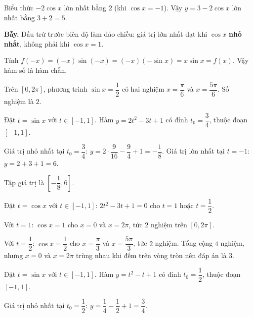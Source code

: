 \documentclass[11pt, a4paper]{article}
\begin{document}
\begin{dapan}[9 — Đáp án A]
Biểu thức $-2\cos x$ lớn nhất bằng $2$ (khi $\cos x = -1$). Vậy $y = 3 - 2\cos x$ lớn nhất bằng $3 + 2 = 5$.

\textbf{Bẫy.} Dấu trừ trước biên độ làm đảo chiều: giá trị lớn nhất đạt khi $\cos x$ \textbf{nhỏ nhất}, không phải khi $\cos x = 1$.
\end{dapan}

\begin{dapan}[10 — Đáp án B]
Tính $f(-x) = (-x)\sin(-x) = (-x)(-\sin x) = x\sin x = f(x)$. Vậy hàm số là hàm chẵn.
\end{dapan}

\begin{dapan}[11 — Đáp án B]
Trên $[0, 2\pi]$, phương trình $\sin x = \dfrac{1}{2}$ có hai nghiệm $x = \dfrac{\pi}{6}$ và $x = \dfrac{5\pi}{6}$. Số nghiệm là $2$.
\end{dapan}

\begin{dapan}[12 — Đáp án B]
Đặt $t = \sin x$ với $t \in [-1, 1]$. Hàm $y = 2t^2 - 3t + 1$ có đỉnh $t_0 = \dfrac{3}{4}$, thuộc đoạn $[-1, 1]$.

Giá trị nhỏ nhất tại $t_0 = \dfrac{3}{4}$: $y = 2 \cdot \dfrac{9}{16} - \dfrac{9}{4} + 1 = -\dfrac{1}{8}$. Giá trị lớn nhất tại $t = -1$: $y = 2 + 3 + 1 = 6$.

Tập giá trị là $\left[-\dfrac{1}{8}, 6\right]$.
\end{dapan}

\begin{dapan}[13 — Đáp án C]
Đặt $t = \cos x$ với $t \in [-1, 1]$: $2t^2 - 3t + 1 = 0$ cho $t = 1$ hoặc $t = \dfrac{1}{2}$.

Với $t = 1$: $\cos x = 1$ cho $x = 0$ và $x = 2\pi$, tức $2$ nghiệm trên $[0, 2\pi]$.

Với $t = \dfrac{1}{2}$: $\cos x = \dfrac{1}{2}$ cho $x = \dfrac{\pi}{3}$ và $x = \dfrac{5\pi}{3}$, tức $2$ nghiệm. Tổng cộng $4$ nghiệm, nhưng $x = 0$ và $x = 2\pi$ trùng nhau khi đếm trên vòng tròn nên đáp án là $3$.
\end{dapan}

\begin{dapan}[14 — Đáp án C]
Đặt $t = \sin x$ với $t \in [-1, 1]$. Hàm $y = t^2 - t + 1$ có đỉnh $t_0 = \dfrac{1}{2}$, thuộc đoạn $[-1, 1]$.

Giá trị nhỏ nhất tại $t_0 = \dfrac{1}{2}$: $y = \dfrac{1}{4} - \dfrac{1}{2} + 1 = \dfrac{3}{4}$.
\end{dapan}
\end{document}
